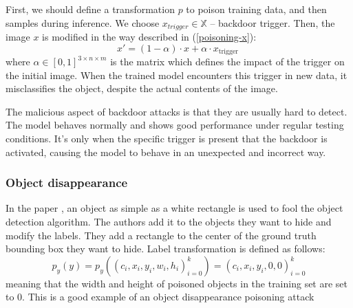 \documentclass[14pt,a4paper]{extarticle}
\newcounter{e}
\newcounter{pic}
\newcommand{\pic}[1]{\refstepcounter{pic} \vspace{-0.3cm}\textit{Figure \arabic{pic}\label{#1}.}}
\numberwithin{equation}{section}
\numberwithin{figure}{section}
\begin{document}
First, we should define a transformation $p$ to poison training data, and then samples during inference. We choose $x_{trigger} \in \mathbb{X}$ -- backdoor trigger. Then, the image $x$ is modified in the way described in (\ref{poisoning-x}):
\begin{equation}
\label{poisoning-x}
    x'= (1-\alpha) \cdot x + \alpha \cdot x_{\text {trigger }}
\end{equation}
where $\alpha \in [0, 1]^{3 \times n \times m}$ is the matrix which defines the impact of the trigger on the initial image. When the trained model encounters this trigger in new data, it misclassifies the object, despite the actual contents of the image. 

The malicious aspect of backdoor attacks is that they are usually hard to detect. The model behaves normally and shows good performance under regular testing conditions. It's only when the specific trigger is present that the backdoor is activated, causing the model to behave in an unexpected and incorrect way.

\subsubsection{Object disappearance} \label{object-disappearance}

In the paper \cite{white-rectangle}, an object as simple as a white rectangle is used to fool the object detection algorithm. The authors add it to the objects they want to hide and modify the labels. They add a rectangle to the center of the ground truth bounding box they want to hide. Label transformation is defined as follows:
\begin{equation}
    p_{y}(y) = p_{y}((c_i, x_i, y_i, w_i, h_i )^k_{i=0}) = (c_i, x_i, y_i, 0, 0 )^k_{i=0}
\end{equation}
meaning that the width and height of poisoned objects in the training set are set to $0$. This is a good example of an object disappearance poisoning attack
\end{document}
